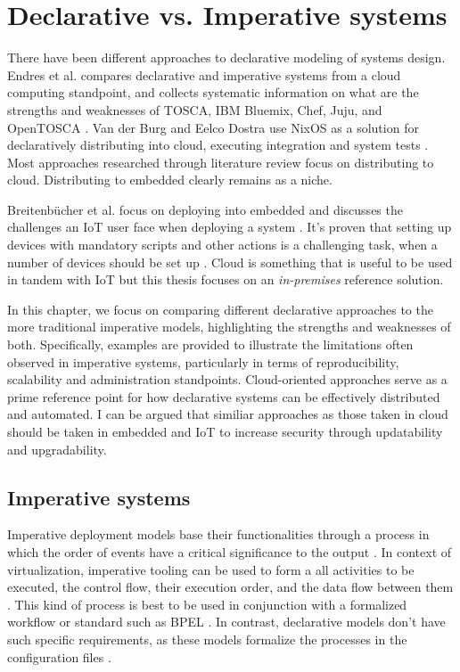 \chapter{Declarative vs. Imperative systems} \label{imperative}

There have been different approaches to declarative modeling of
systems design. Endres et al. compares declarative and imperative
systems from a cloud computing standpoint, and collects systematic
information on what are the strengths and weaknesses of TOSCA, IBM
Bluemix, Chef, Juju, and OpenTOSCA \cite{endres2017declarative}. Van
der Burg and Eelco Dostra use NixOS as a solution for declaratively
distributing into cloud, executing integration and system tests
\cite{van2010declarative}. Most approaches researched through
literature review focus on distributing to cloud. Distributing to
embedded clearly remains as a niche.

Breitenbücher et al. focus on deploying into embedded and discusses
the challenges an IoT user face when deploying a system \cite{breitenbucher2017declarative}. It's proven
that setting up devices with mandatory scripts and other actions is a
challenging task, when a number of devices should be set up \cite{breitenbucher2017declarative}. Cloud is
something that is useful to be used in tandem with IoT but this thesis
focuses on an \textit{in-premises} reference
solution. 

In this chapter, we focus on comparing different declarative
approaches to the more traditional imperative models, highlighting the
strengths and weaknesses of both. Specifically, examples are provided
to illustrate the limitations often observed in imperative systems,
particularly in terms of reproducibility, scalability and
administration standpoints. Cloud-oriented approaches serve as a prime
reference point for how declarative systems can be effectively
distributed and automated. I can be argued that similiar approaches as those
taken in cloud should be taken in embedded and IoT to increase security through updatability and upgradability.

\section{Imperative systems}

Imperative deployment models base their functionalities through a
process in which the order of events have a critical significance to
the output \cite{breitenbucher2017declarative}. In context of
virtualization, imperative tooling can be used to form a all
activities to be executed, the control flow, their execution order,
and the data flow between them \cite{endres2017declarative}. This kind
of process is best to be used in conjunction with a formalized
workflow or standard such as BPEL \cite{endres2017declarative}. In
contrast, declarative models don't have such specific requirements, as
these models formalize the processes in the configuration files
\cite{endres2017declarative}.

